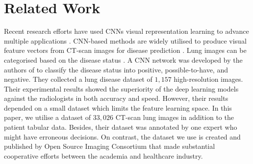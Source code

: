 \documentclass[conference]{IEEEtran}
\begin{document}
\section{Related Work}\label{rw}
Recent research efforts have used CNNs visual representation learning to advance multiple applications \cite{zhang2019aet,kolesnikov2019revisiting,hamdi2020drotrack}. CNN-based methods are widely utilised to produce visual feature vectors from CT-scan images for disease prediction \cite{yamashita2018convolutional}. Lung images can be categorised based on the disease status \cite{raghu2011official,bueno2018updated}. A CNN network was developed by the authors of \cite{walsh2018deep} to classify the disease status into positive, possible-to-have, and negative. They collected a lung disease dataset of $1,157$ high-resolution images. Their experimental results showed the superiority of the deep learning models against the radiologists in both accuracy and speed. However, their results depended on a small dataset which limits the feature learning space. In this paper, we utilise a dataset of $33,026$ CT-scan lung images in addition to the patient tabular data. Besides, their dataset was annotated by one expert who might have erroneous decisions. On contrast, the dataset we use is created and published by Open Source Imaging Consortium that made substantial cooperative efforts between the academia and healthcare industry.
\end{document}
